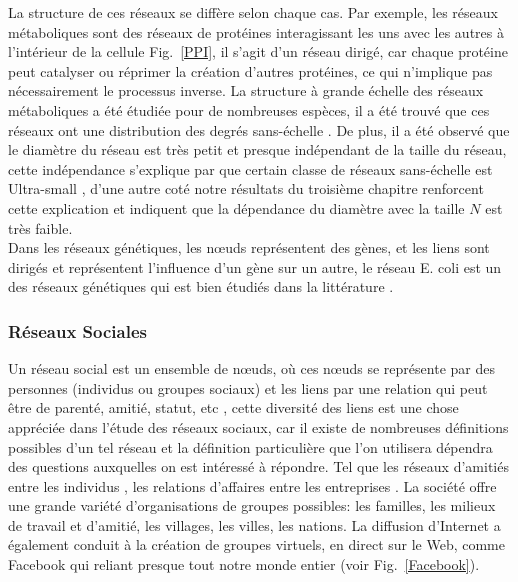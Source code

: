  La structure de ces réseaux se diffère selon chaque cas. Par exemple, les réseaux métaboliques sont des réseaux de protéines interagissant les uns avec les autres à l'intérieur de la cellule Fig.~\ref{PPI}, il s'agit d'un réseau dirigé, car chaque protéine peut catalyser ou réprimer la création d'autres protéines, ce qui n'implique pas nécessairement le processus inverse. La structure à grande échelle des réseaux métaboliques a été étudiée pour de nombreuses espèces, il a été trouvé que ces réseaux ont une distribution des degrés sans-échelle \cite{Je-al2000}. De plus, il a été observé que le diamètre du réseau est très petit et presque indépendant de la taille du réseau, cette indépendance s'explique par que certain classe de réseaux sans-échelle est Ultra-small \cite{Cohen-Havlin2003,Do-al2003,ChL2003}, d'une autre coté notre résultats du troisième chapitre renforcent cette explication et indiquent que la dépendance du diamètre avec la taille $N$ est très faible.\\ Dans les réseaux génétiques, les nœuds représentent des gènes, et les liens sont dirigés  et représentent l'influence d'un gène sur un autre, le réseau E. coli est un des réseaux génétiques qui est bien étudiés dans la littérature \cite{Mi-al2002}.


  \subsubsection{Réseaux Sociales}
  Un réseau social est un ensemble de nœuds, où ces nœuds se représente par des  personnes  (individus ou groupes sociaux) et les liens par une relation qui peut être de parenté, amitié, statut, etc \cite{JS2000}, cette diversité des liens est une chose appréciée dans l'étude des réseaux sociaux, car il existe de nombreuses définitions possibles d'un tel réseau et la définition particulière que l'on utilisera dépendra des questions auxquelles on est intéressé à répondre. Tel que les réseaux d'amitiés entre les individus \cite{WW1977,Mo1934}, les relations d'affaires entre les entreprises \cite{JP1977}.
  La société offre une grande variété d'organisations de groupes possibles: les familles, les milieux de travail et d'amitié, les villages, les villes, les nations. La diffusion d'Internet a également conduit à la création de groupes virtuels, en direct sur le Web, comme Facebook qui reliant presque tout  notre monde entier (voir Fig.~\ref{Facebook}).
  

